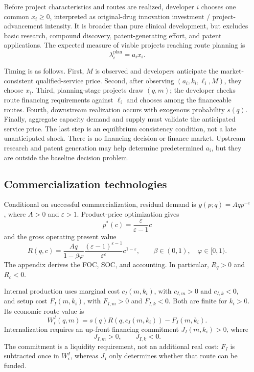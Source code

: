 \documentclass[12pt]{article}
\newcommand{\1}{\mathbf{1}}
\begin{document}
Before project characteristics and routes are realized, developer \(i\)
chooses one common \(x_i\geq0\), interpreted as original-drug innovation
investment / project-advancement intensity. It is broader than pure clinical
development, but excludes basic research, compound discovery,
patent-generating effort, and patent applications. The expected measure of
viable projects reaching route planning is
\begin{equation}
  \lambda_i^{\mathrm{plan}}=a_ix_i.
  \label{eq:p16m-planning}
\end{equation}

Timing is as follows. First, \(M\) is observed and developers anticipate the
market-consistent qualified-service price. Second, after observing
\((a_i,k_i,\ell_i,M)\), they choose \(x_i\). Third, planning-stage projects
draw \((q,m)\); the developer checks route financing requirements against
\(\ell_i\) and chooses among the financeable routes. Fourth, downstream
realization occurs with exogenous probability \(s(q)\). Finally, aggregate
capacity demand and supply must validate the anticipated service price. The
last step is an equilibrium consistency condition, not a late unanticipated
shock. There is no financing decision or finance market. Upstream research
and patent generation may help determine predetermined \(a_i\), but they are
outside the baseline decision problem.

\subsection{Commercialization technologies}
\label{subsec:p16m-technologies}

Conditional on successful commercialization, residual demand is
\(y(p;q)=Aqp^{-\varepsilon}\), where \(A>0\) and \(\varepsilon>1\).
Product-price optimization gives
\[
  p^*(c)=\frac{\varepsilon}{\varepsilon-1}c
\]
and the gross operating present value
\begin{equation}
  R(q,c)
  =
  \frac{Aq}{1-\beta\varphi}
  \frac{(\varepsilon-1)^{\varepsilon-1}}
       {\varepsilon^\varepsilon}
  c^{1-\varepsilon},
  \qquad
  \beta\in(0,1),\quad \varphi\in[0,1).
  \label{eq:p16m-return}
\end{equation}
The appendix derives the FOC, SOC, and accounting. In particular,
\(R_q>0\) and \(R_c<0\).

Internal production uses marginal cost \(c_I(m,k_i)\), with
\(c_{I,m}>0\) and \(c_{I,k}<0\), and setup cost \(F_I(m,k_i)\), with
\(F_{I,m}>0\) and \(F_{I,k}<0\). Both are finite for \(k_i>0\). Its economic
route value is
\begin{equation}
  W_i^I(q,m)
  =
  s(q)R\!\left(q,c_I(m,k_i)\right)-F_I(m,k_i).
  \label{eq:p16m-internal}
\end{equation}
Internalization requires an up-front financing commitment \(J_I(m,k_i)>0\),
where
\[
  J_{I,m}>0,
  \qquad
  J_{I,k}<0.
\]
The commitment is a liquidity requirement, not an additional real cost:
\(F_I\) is subtracted once in \(W_i^I\), whereas \(J_I\) only determines
whether that route can be funded.
\end{document}
